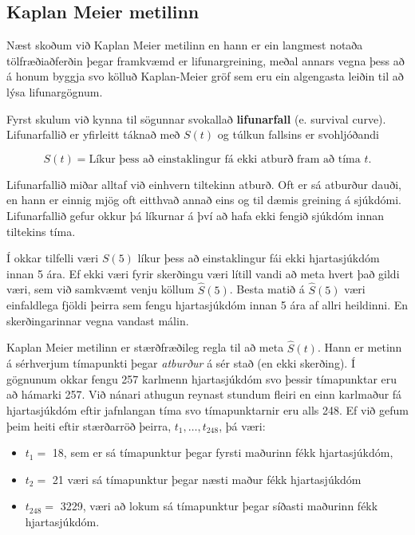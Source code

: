 \documentclass[
]{book}
\providecommand{\tightlist}{%
  \setlength{\itemsep}{0pt}\setlength{\parskip}{0pt}}
\begin{document}
\hypertarget{kaplan-meier-metilinn}{%
\subsection{Kaplan Meier metilinn}\label{kaplan-meier-metilinn}}

Næst skoðum við Kaplan Meier metilinn en hann er ein langmest notaða tölfræðiaðferðin þegar framkvæmd er lifunargreining, meðal annars vegna þess að á honum byggja svo kölluð Kaplan-Meier gröf sem eru ein algengasta leiðin til að lýsa lifunargögnum.

Fyrst skulum við kynna til sögunnar svokallað \textbf{lifunarfall} (e. survival curve). Lifunarfallið er yfirleitt táknað með \(S(t)\) og túlkun fallsins er svohljóðandi

\[ 
S(t) = \text{Líkur þess að einstaklingur fá ekki atburð fram að tíma $t$.}
\]

Lifunarfallið miðar alltaf við einhvern tiltekinn atburð. Oft er sá atburður dauði, en hann er einnig mjög oft eitthvað annað eins og til dæmis greining á sjúkdómi. Lifunarfallið gefur okkur þá líkurnar á því að hafa ekki fengið sjúkdóm innan tiltekins tíma.

Í okkar tilfelli væri \(S(5)\) líkur þess að einstaklingur fái ekki hjartasjúkdóm innan 5 ára. Ef ekki væri fyrir skerðingu væri lítill vandi að meta hvert það gildi væri, sem við samkvæmt venju köllum \(\hat S(5)\). Besta matið á \(\hat S(5)\) væri einfaldlega fjöldi þeirra sem fengu hjartasjúkdóm innan 5 ára af allri heildinni. En skerðingarinnar vegna vandast málin.

Kaplan Meier metilinn er stærðfræðileg regla til að meta \(\hat S(t)\). Hann er metinn á sérhverjum tímapunkti þegar \emph{atburður} á sér stað (en ekki skerðing). Í gögnunum okkar fengu 257 karlmenn hjartasjúkdóm svo þessir tímapunktar eru að hámarki 257. Við nánari athugun reynast stundum fleiri en einn karlmaður fá hjartasjúkdóm eftir jafnlangan tíma svo tímapunktarnir eru alls 248. Ef við gefum þeim heiti eftir stærðarröð þeirra, \(t_1, \ldots , t_{248}\), þá væri:

\begin{itemize}
\tightlist
\item
  \(t_1 =\) 18, sem er sá tímapunktur þegar fyrsti maðurinn fékk hjartasjúkdóm,
\item
  \(t_2 =\) 21 væri sá tímapunktur þegar næsti maður fékk hjartasjúkdóm
\item
  \(t_{248} =\) 3229, væri að lokum sá tímapunktur þegar síðasti maðurinn fékk hjartasjúkdóm.
\end{itemize}
\end{document}
